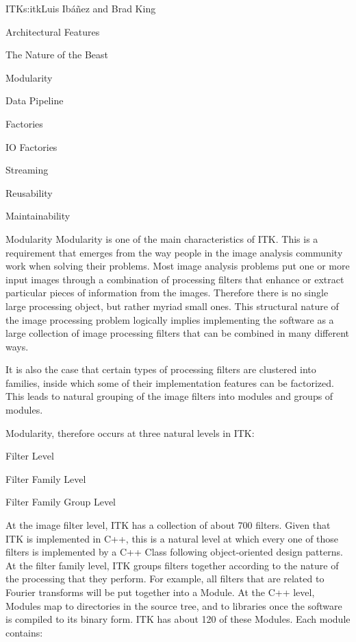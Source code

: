 \begin{aosachapter}{ITK}{s:itk}{Luis Ib\'{a}\~{n}ez and Brad King}
\begin{aosasect1}{Architectural Features}
\begin{aosasect2}{The Nature of the Beast}
\begin{aosaitemize}
\item Modularity
\item Data Pipeline
\item Factories
\item IO Factories
\item Streaming
\item Reusability
\item Maintainability
\end{aosaitemize}

\end{aosasect2}

\begin{aosasect2}{Modularity}
Modularity is one of the main characteristics of ITK. This is a requirement
that emerges from the way people in the image analysis community work when
solving their problems. Most image analysis problems put one or more
input images through a combination of processing filters that enhance or
extract particular pieces of information from the images. Therefore
there is no single large processing object, but rather myriad small ones.
This structural nature of the image processing problem logically implies implementing the
software as a large collection of image processing filters that can be combined
in many different ways.

It is also the case that certain types of processing filters are clustered into
families, inside which some of their implementation features can be factorized.
This leads to natural grouping of the image filters into modules and groups of
modules.

Modularity, therefore occurs at three natural levels in ITK:

\begin{aosaitemize}
\item Filter Level
\item Filter Family Level
\item Filter Family Group Level
\end{aosaitemize}

At the image filter level, ITK has a collection of about 700 filters. Given
that ITK is implemented in C++, this is a natural level at which every one of
those filters is implemented by a C++ Class following object-oriented 
design patterns.  At the filter family level, ITK groups filters together
according to the nature of the processing that they perform. For example, all
filters that are related to Fourier transforms will be put together into a
Module.  At the C++ level, Modules map to directories in the
source tree, and to libraries once the software is compiled to its
binary form. ITK has about 120 of these Modules. Each module contains:


\end{aosasect2}
\end{aosasect1}
\end{aosachapter}
